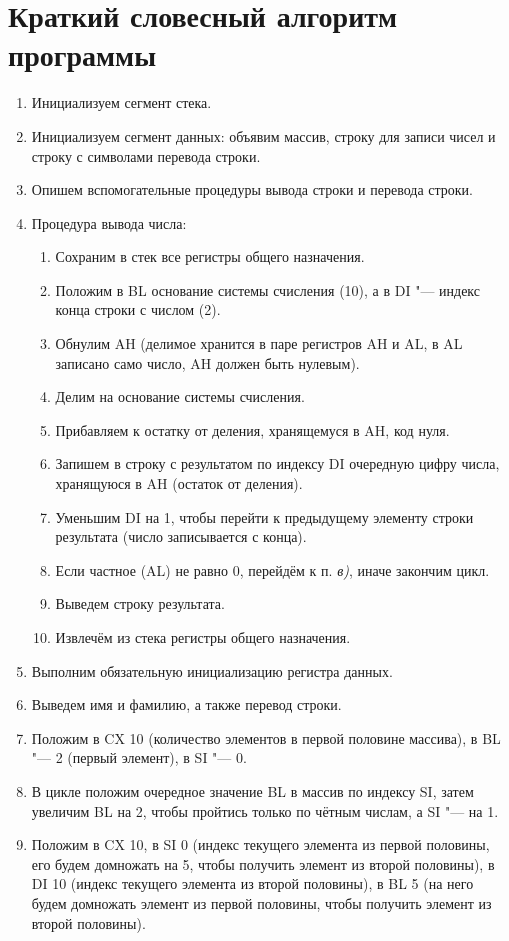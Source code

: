 \documentclass[bachelor, och, otchet]{../SCWorks}
\begin{document}
\section{Краткий словесный алгоритм программы}
\begin{enumerate}
\item Инициализуем сегмент стека.
\item Инициализуем сегмент данных: объявим массив, строку для записи чисел и строку с символами перевода строки.
\item Опишем вспомогательные процедуры вывода строки и перевода строки.
\item Процедура вывода числа:
\begin{enumerate}
	\item Сохраним в стек все регистры общего назначения.
	\item Положим в BL основание системы счисления (10), а в DI "--- индекс конца строки с числом (2).
	\item Обнулим AH (делимое хранится в паре регистров AH и AL, в AL записано само число, AH должен быть нулевым).
	\item Делим на основание системы счисления.
	\item Прибавляем к остатку от деления, хранящемуся в AH, код нуля.
	\item Запишем в строку с результатом по индексу DI очередную цифру числа, хранящуюся в AH (остаток от деления).
	\item Уменьшим DI на 1, чтобы перейти к предыдущему элементу строки результата (число записывается с конца).
	\item Если частное (AL) не равно 0, перейдём к п. \textit{в)}, иначе закончим цикл.
	\item Выведем строку результата.
	\item Извлечём из стека регистры общего назначения.
\end{enumerate}
\item Выполним обязательную инициализацию регистра данных.
\item Выведем имя и фамилию, а также перевод строки.
\item Положим в CX 10 (количество элементов в первой половине массива), в BL "--- 2 (первый элемент), в SI "--- 0.
\item В цикле положим очередное значение BL в массив по индексу SI, затем увеличим BL на 2, чтобы пройтись только по чётным числам, а SI "--- на 1.
\item Положим в CX 10, в SI 0 (индекс текущего элемента из первой половины, его будем домножать на 5, чтобы получить элемент из второй половины), в DI 10 (индекс текущего элемента из второй половины), в BL 5 (на него будем домножать элемент из первой половины, чтобы получить элемент из второй половины).

\end{enumerate}
\end{document}
